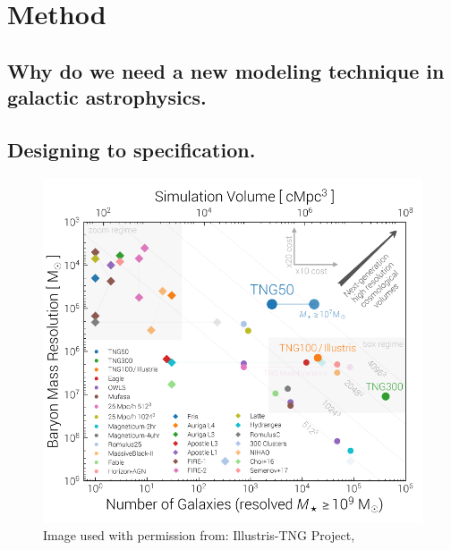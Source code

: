 
\chapter{Method} %
\label{Chapter:Method}

\section{Why do we need a new modeling technique in galactic astrophysics.}
\section{Designing to specification.}
\begin{figure}[h]
    \centering
    \includegraphics[width = \linewidth]{Figures/Chapter2/VolumeResolutionComparison.png}
    \caption{Image used with permission from: Illustris-TNG Project, \citet{Nelson2019FirstFeedback}}
    \label{fig:Bolshoi}
\end{figure}

